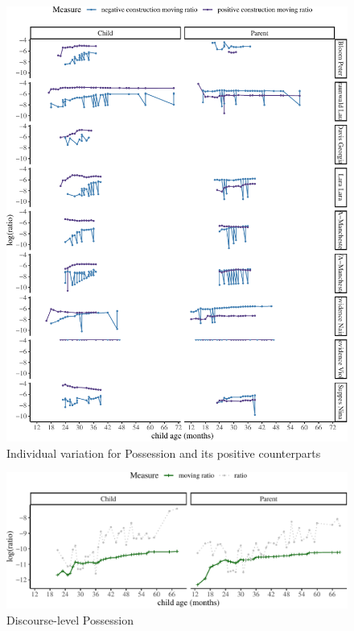 \documentclass[
  english,
  man,floatsintext]{apa6}
\begin{document}
\begin{figure}[H]

{\centering \includegraphics{neg_construction_article_files/figure-latex/individualpossession-1} 

}

\caption{Individual variation for Possession and its positive counterparts}\label{fig:individualpossession}
\end{figure}

\begin{figure}[H]

{\centering \includegraphics{neg_construction_article_files/figure-latex/possessiondiscourse-1} 

}

\caption{Discourse-level Possession}\label{fig:possessiondiscourse}
\end{figure}
\end{document}

